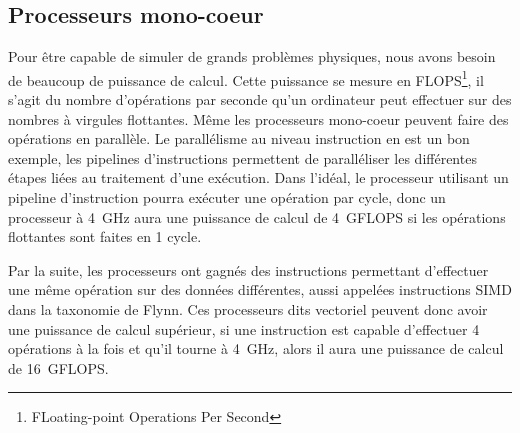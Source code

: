 \subsection{Processeurs mono-coeur}
Pour être capable de simuler de grands problèmes physiques, nous avons besoin de beaucoup de puissance de calcul.
%
Cette puissance se mesure en FLOPS\footnote{FLoating-point Operations Per Second}, il s'agit du nombre d'opérations par seconde qu'un ordinateur peut effectuer sur des nombres à virgules flottantes.
%
Même les processeurs mono-coeur peuvent faire des opérations en parallèle.
%
Le parallélisme au niveau instruction en est un bon exemple, les pipelines d'instructions permettent de paralléliser les différentes étapes liées au traitement d'une exécution.
%
Dans l'idéal, le processeur utilisant un pipeline d'instruction pourra exécuter une opération par cycle, donc un processeur à 4~GHz aura une puissance de calcul de 4~GFLOPS si les opérations flottantes sont faites en 1 cycle.


Par la suite, les processeurs ont gagnés des instructions permettant d'effectuer une même opération sur des données différentes, aussi appelées instructions SIMD dans la taxonomie de Flynn.
%
Ces processeurs dits vectoriel peuvent donc avoir une puissance de calcul supérieur, si une instruction est capable d'effectuer 4 opérations à la fois et qu'il tourne à 4~GHz, alors il aura une puissance de calcul de 16~GFLOPS.

